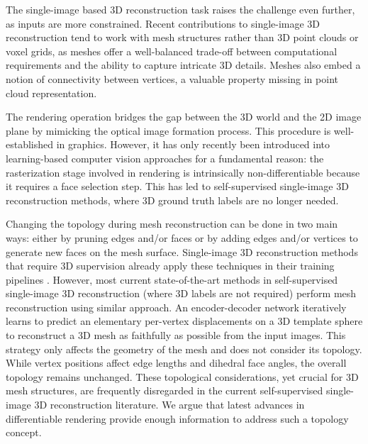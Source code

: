 The single-image based 3D reconstruction task raises the challenge even further, as inputs are more constrained. Recent contributions to single-image 3D reconstruction tend to work with mesh structures rather than 3D point clouds or voxel grids, as meshes offer a well-balanced trade-off between computational requirements and the ability to capture intricate 3D details. Meshes also embed a notion of connectivity between vertices, a valuable property missing in point cloud representation. 

The rendering operation bridges the gap between the 3D world and the 2D image plane by mimicking the optical image formation process. This procedure is well-established in graphics. However, it has only recently been introduced into learning-based computer vision approaches for a fundamental reason: the rasterization stage involved in rendering is intrinsically non-differentiable because it requires a face selection step. This has led to self-supervised single-image 3D reconstruction methods, where 3D ground truth labels are no longer needed.

Changing the topology during mesh reconstruction can be done in two main ways: either by pruning edges and/or faces or by adding edges and/or vertices to generate new faces on the mesh surface. Single-image 3D reconstruction methods that require 3D supervision already apply these techniques in their training pipelines \citep{pan2019deep,nie2020total3dunderstanding,smith2019geometrics}. However, most current state-of-the-art methods in self-supervised single-image 3D reconstruction (where 3D labels are not required) perform mesh reconstruction using similar approach. An encoder-decoder network iteratively learns to predict an elementary per-vertex displacements on a 3D template sphere to reconstruct a 3D mesh as faithfully as possible from the input images. This strategy only affects the geometry of the mesh and does not consider its topology. While vertex positions affect edge lengths and dihedral face angles, the overall topology remains unchanged. These topological considerations, yet crucial for 3D mesh structures, are frequently disregarded in the current self-supervised single-image 3D reconstruction literature. We argue that latest advances in differentiable rendering \citep{liu2019soft,ravi2020accelarating} provide enough information to address such a topology concept.

